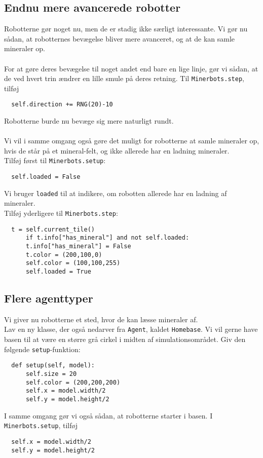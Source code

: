 \documentclass[12pt]{article}
\begin{document}
\subsection{Endnu mere avancerede robotter}
Robotterne gør noget nu, men de er stadig ikke særligt interessante. Vi gør nu sådan, at robotternes bevægelse bliver mere avanceret, og at de kan samle mineraler op.\\\\
For at gøre deres bevægelse til noget andet end bare en lige linje, gør vi sådan, at de ved hvert trin ændrer en lille smule på deres retning. Til \texttt{Minerbots.step}, tilføj
\begin{lstlisting}
  self.direction += RNG(20)-10
\end{lstlisting}
Robotterne burde nu bevæge sig mere naturligt rundt.\\\\
Vi vil i samme omgang også gøre det muligt for robotterne at samle mineraler op, hvis de står på et mineral-felt, og ikke allerede har en ladning mineraler.\\
Tilføj først til \texttt{Minerbots.setup}:
\begin{lstlisting}
  self.loaded = False
\end{lstlisting}
Vi bruger \texttt{loaded} til at indikere, om robotten allerede har en ladning af mineraler.\\
Tilføj yderligere til \texttt{Minerbots.step}:
\begin{lstlisting}
  t = self.current_tile()
      if t.info["has_mineral"] and not self.loaded:
      t.info["has_mineral"] = False
      t.color = (200,100,0)
      self.color = (100,100,255)
      self.loaded = True
\end{lstlisting}

\subsection{Flere agenttyper}
Vi giver nu robotterne et sted, hvor de kan læsse mineraler af.\\
Lav en ny klasse, der også nedarver fra \texttt{Agent}, kaldet \texttt{Homebase}. Vi vil gerne have basen til at være en større grå cirkel i midten af simulationsområdet. Giv den følgende \texttt{setup}-funktion:
\begin{lstlisting}
  def setup(self, model):
      self.size = 20
      self.color = (200,200,200)
      self.x = model.width/2
      self.y = model.height/2
\end{lstlisting}
I samme omgang gør vi også sådan, at robotterne starter i basen. I \texttt{Minerbots.setup}, tilføj
\begin{lstlisting}
  self.x = model.width/2
  self.y = model.height/2
\end{lstlisting}
\end{document}
